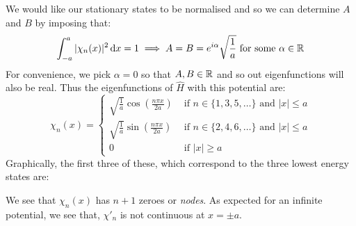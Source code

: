 \documentclass[../main.tex]{subfiles}
\begin{document}
We would like our stationary states to be normalised and so we can determine $A$ and $B$ by imposing that:
\[
  \int_{-a}^{a} |\chi_n(x)|^2 \d{x} = 1 \implies A = B = e^{i\alpha}\sqrt{\frac{1}{a}} \text{ for some } \alpha \in \R
\]
For convenience, we pick $\alpha = 0$ so that $A, B \in \mathbb{R}$ and so out eigenfunctions will also be real.
Thus the eigenfunctions of $\hat{H}$ with this potential are:
\[
  \chi_n(x) = \begin{cases}
  \sqrt{\frac{1}{a}} \cos\left(\frac{n \pi x}{2a}\right) & \text{ if } n \in \{1, 3, 5, \ldots\} \text{ and } |x| \leq a \\
  \sqrt{\frac{1}{a}} \sin\left(\frac{n \pi x}{2a}\right) & \text{ if } n \in \{2, 4, 6, \ldots\} \text{ and } |x| \leq a \\
  0 & \text{ if } |x| \geq a
  \end{cases}
\]
Graphically, the first three of these, which correspond to the three lowest energy states are:
\begin{center}
\end{center}
We see that $\chi_n(x)$ has $n + 1$ zeroes or \textit{nodes}.
As expected for an infinite potential, we see that, $\chi'_n$ is not continuous at $x = \pm a$.
\end{document}
